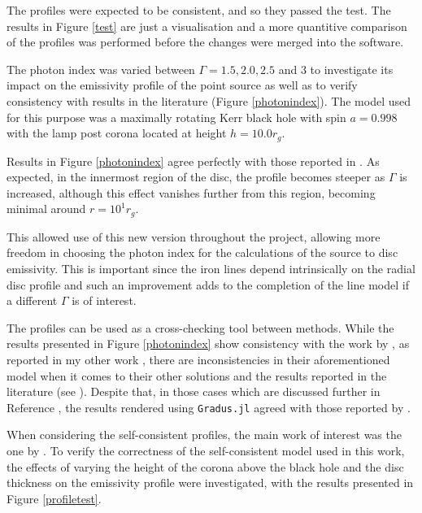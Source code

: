 \documentclass[fleqn,usenatbib,useAMS]{mnras}
\begin{document}
The profiles were expected to be consistent, and so they passed the test. The results in Figure \ref{test} are just a visualisation and a more quantitive comparison of the profiles was performed before the changes were merged into the software.

The photon index was varied between $\Gamma = 1.5, 2.0, 2.5$ and $3$ to investigate its impact on the emissivity profile of the point source as well as to verify consistency with results in the literature (Figure \ref{photonindex}). The model used for this purpose was a maximally rotating Kerr black hole with spin $a = 0.998$ with the lamp post corona located at height $h = 10.0 r_{g}$. 

Results in Figure \ref{photonindex} agree perfectly with those reported in \cite{gonzalez2017probing}. As expected, in the innermost region of the disc, the profile becomes steeper as $\Gamma$ is increased, although this effect vanishes further from this region, becoming minimal around $r = 10^{1} r_{g}$. 

This allowed use of this new version throughout the project, allowing more freedom in choosing the photon index for the calculations of the source to disc emissivity. This is important since the iron lines depend intrinsically on the radial disc profile and such an improvement adds to the completion of the line model if a different $\Gamma$ is of interest. 

The profiles can be used as a cross-checking tool between methods. While the results presented in Figure \ref{photonindex} show consistency with the work by \cite{gonzalez2017probing}, as reported in my other work \cite{tarnopolska2024properties}, there are inconsistencies in their aforementioned model when it comes to their other solutions and the results reported in the literature (see \cite{wilkins2012understanding}). Despite that, in those cases which are discussed further in Reference \cite{tarnopolska2024properties}, the results rendered using {\tt Gradus.jl} agreed with those reported by \cite{dauser2013irradiation}.

When considering the self-consistent profiles, the main work of interest was the one by \cite{taylor2018exploring}. To verify the correctness of the self-consistent model used in this work, the effects of varying the height of the corona above the black hole and the disc thickness on the emissivity profile were investigated, with the results presented in Figure \ref{profiletest}.
\end{document}
